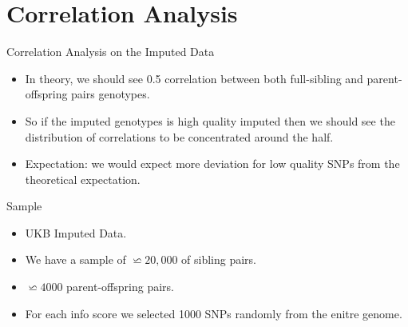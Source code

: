 \documentclass{beamer}
\begin{document}
\section{Correlation Analysis}



\begin{frame}{Correlation Analysis on the Imputed Data}
    

      \begin{itemize}
          \item In theory, we should see 0.5 correlation between both full-sibling and parent-offspring pairs genotypes.
          \item So if the imputed genotypes is high quality imputed then we should see the distribution of correlations to be concentrated around the half.
          \item Expectation: we would expect more deviation for low quality SNPs from the theoretical expectation.
      \end{itemize}
      

\end{frame}




\begin{frame}{Sample}
    
\begin{itemize}

      \item UKB Imputed Data.
      \item We have a sample of \(\backsimeq 20,000\) of sibling pairs. %
      \item \(\backsimeq 4000\) parent-offspring pairs.
      \item For each info score we selected 1000 SNPs randomly from the enitre genome.

\end{itemize}

\end{frame}
\end{document}
